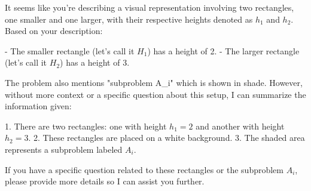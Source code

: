 It seems like you're describing a visual representation involving two rectangles, one smaller and one larger, with their respective heights denoted as \( h_1 \) and \( h_2 \). Based on your description:

- The smaller rectangle (let's call it \( H_1 \)) has a height of 2.
- The larger rectangle (let's call it \( H_2 \)) has a height of 3.

The problem also mentions "subproblem A_i" which is shown in shade. However, without more context or a specific question about this setup, I can summarize the information given:

1. There are two rectangles: one with height \( h_1 = 2 \) and another with height \( h_2 = 3 \).
2. These rectangles are placed on a white background.
3. The shaded area represents a subproblem labeled \( A_i \).

If you have a specific question related to these rectangles or the subproblem \( A_i \), please provide more details so I can assist you further.